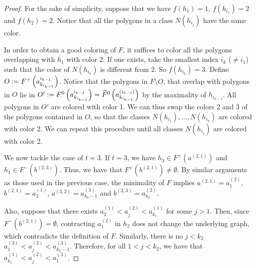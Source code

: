\documentclass[12pt]{article}
\theoremstyle{definition}
\newcommand{\defeq}{\vcentcolon=}
\begin{document}
\begin{proof}
         For the sake of simplicity,
         suppose that we have
         $f\left(h_1\right) = 1$,
         $f\left(h_{i_1}\right) = 2$ and
         $f\left(h_2\right) = 2$.
         Notice that all the polygons
         in a class $N\left(h_{i_{j}}\right)$ 
         have the same color.

         In order to obtain a good coloring
         of $F$, it suffices to color all the polygons
         overlapping with $h_1$ with color 2.
         If one exists, take the smallest index
         $i_{k}$ ($\neq i_1$) such that 
         the color of $N\left(h_{i_{k}}\right)$ 
         is different from 2. So $f\left(h_{i_{k}}\right) = 3$.
         Define $O \defeq F^{+}\left(a_{k_{i_{k-1}}}^{i_{k-1}}\right)$.
         Notice that the polygons 
         in $F \setminus O$, that overlap
         with polygons in $O$ lie in
         $O' \defeq F^{0}\left(a_{k_{i_{k-1}}}^{i_{k-1}}\right) =
         \widetilde{F}^{0}\left(a_{k_{i_{k-1}}}^{\left(i_{k-1}\right)}\right)$
         by the maximality of $h_{i_{k-1}}$.
         All polygons in $O'$ are colored
         with color 1.
         We can thus swap the colors
         2 and 3 of the polygons 
         contained in $O$, so that
         the classes $N\left(h_{i_1}\right),
         \ldots, N\left(h_{i_{k}}\right)$ are
         colored with color 2.
         We can repeat this procedure until
         all classes $N\left(h_{i_{j}}\right)$ 
         are colored with color 2.

         We now tackle the case of $t = 3$.
         If $t = 3$, we have $h_3 \in F^{+}
         \left(a^{\left(2, 1\right)}\right)$ 
         and $h_1 \in F^{-}\left(b^{\left(2, 3\right)}\right)$.
         Thus, we have that $F^{+}\left(b^{\left(2, 1\right)}\right)
         \neq \emptyset$.
         By similar arguments as those
         used in the previous case,
         the minimality of $F$ implies
         $a^{\left(2, 1\right)} = a_1^{\left(2\right)}$,
         $b^{\left(2, 1\right)} = a_2^{\left(1\right)}$,
         $a^{\left(3, 2\right)} = a_{k_3 - 1}^{\left(3\right)}$ and
         $b^{\left(2, 3\right)} = a_{k_2}^{\left(2\right)}$.

         Also, suppose that there exists
         $a_2^{\left(1\right)} < a_{j}^{\left(2\right)} <
         a_{k_1}^{\left(1\right)}$ for
         some $j > 1$. Then,
         since $F^{-}\left(b^{\left(2, 1\right)}\right) = \emptyset$, 
         contracting $a_1^{\left(2\right)}$ 
         in $h_2$ does not change the
         underlying graph, which
         contradicts the definition of $F$.
         Similarly, there is no
         $j < k_2$ $a_1^{\left(3\right)} <
         a_{j}^{\left(2\right)} <
         a_{k_3-1}^{\left(3\right)}$.
         Therefore, for all
         $1 < j < k_2$, we have
         that $a_{k_1}^{\left(1\right)} < 
         a_{j}^{\left(2\right)} < 
         a_1^{\left(3\right)}$.


\end{proof}
\end{document}

